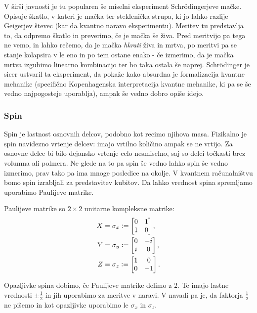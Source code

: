 \documentclass[mat1]{fmfdelo}
\newcommand{\defeq}{\vcentcolon=}
\begin{document}
V širši javnosti je tu popularen še miselni eksperiment Schrödingerjeve mačke. Opisuje škatlo, v kateri je mačka ter steklenička strupa, ki jo lahko razlije Geigerjev števec (kar da kvantno naravo eksperimentu). Meritev tu predstavlja to, da odpremo škatlo in preverimo, če je mačka še živa. Pred meritvijo pa tega ne vemo, in lahko rečemo, da je mačka \emph{hkrati} živa in mrtva, po meritvi pa se stanje kolapsira v le eno in po tem ostane enako - če izmerimo, da je mačka mrtva izgubimo linearno kombinacijo ter bo taka ostala še naprej. Schrödinger je sicer ustvaril ta eksperiment, da pokaže kako absurdna je formalizacija kvantne mehanike (specifično Kopenhagenska interpretacija kvantne mehanike, ki pa se še vedno najpogosteje uporablja), ampak še vedno dobro opiše idejo.

\subsubsection{Spin}
Spin je lastnost osnovnih delcov, podobno kot recimo njihova masa. Fizikalno je spin navidezno vrtenje delcev: imajo vrtilno količino ampak se ne vrtijo. Za osnovne delce bi bilo dejansko vrtenje celo nesmiselno, saj so delci točkasti brez volumna ali polmera. Ne glede na to pa spin še vedno lahko spin še vedno izmerimo, prav tako pa ima mnoge posledice na okolje. V kvantnem računalništvu bomo spin izrabljali za predstavitev kubitov. Da lahko vrednost spina spremljamo uporabimo Paulijeve matrike.
\begin{definicija} \label{Pauli} Paulijeve matrike so \(2\times 2\) unitarne kompleksne matrike:
    \begin{align*}
        X &= \sigma_x \defeq \begin{bmatrix}
            0&1\\
            1&0
        \end{bmatrix},\\
        Y &= \sigma_y \defeq \begin{bmatrix}
            0&-i\\
            i&0
        \end{bmatrix},\\
        Z &= \sigma_z \defeq \begin{bmatrix}
            1&0\\
            0&-1
        \end{bmatrix}.
    \end{align*}
\end{definicija}
Opazljivke spina dobimo, če Paulijeve matrike delimo z \(2\). Te imajo lastne vrednosti \(\pm \frac12\) in jih uporabimo za meritve v naravi. V navadi pa je, da faktorja \(\frac12\) ne pišemo in kot opazljivke uporabimo le \(\sigma_x\) in \(\sigma_z\).
\end{document}
